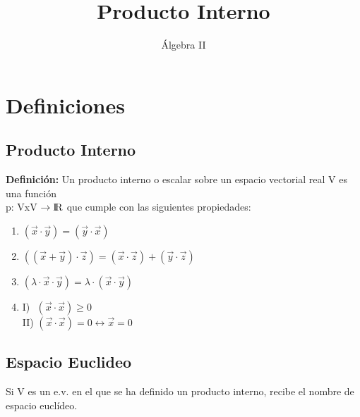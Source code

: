 \documentclass[11pt]{article}
\title{Producto Interno}
\author{Álgebra II}
\date{\vspace{-5ex}}
\begin{document}
\maketitle{}
\section{Definiciones}
\subsection{Producto Interno}
\textbf{Definición:} Un producto interno o escalar sobre un espacio vectorial real V  es una función \\
p: VxV $\rightarrow \rm I\!R $ que cumple con las siguientes propiedades:
\begin{enumerate}
\item $(\vec{x}\cdot\vec{y})=(\vec{y}\cdot\vec{x})$ 
\item $((\vec{x}+\vec{y})\cdot\vec{z})=(\vec{x}\cdot\vec{z})+(\vec{y}\cdot\vec{z})$
\item $(\lambda\cdot\vec{x}\cdot\vec{y}) = \lambda\cdot(\vec{x}\cdot\vec{y})$
\item I) $ $ $(\vec{x}\cdot\vec{x}) \geq 0$ \\ II) $(\vec{x}\cdot\vec{x}) = 0 \leftrightarrow \vec{x}=0 $
\end{enumerate}
\subsection{Espacio Euclideo}
Si V es un e.v. en el que se ha definido un producto interno, recibe el nombre de espacio euclídeo. 
\end{document}
